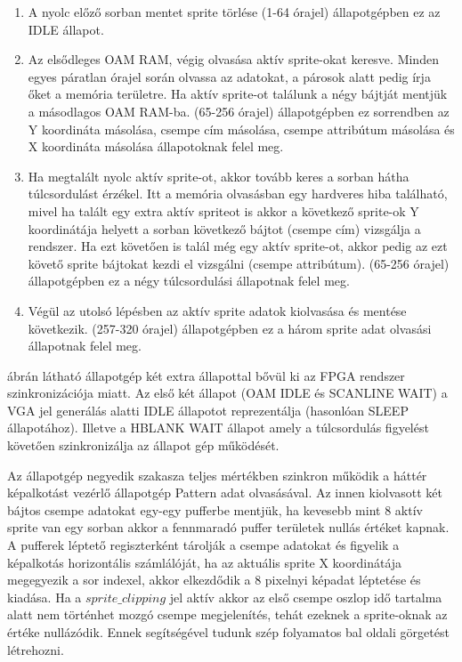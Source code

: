 	\begin{enumerate}
		\item A nyolc előző sorban mentet sprite törlése (1-64 órajel)  állapotgépben ez az IDLE állapot.
		\item Az elsődleges OAM RAM, végig olvasása aktív sprite-okat keresve. Minden egyes páratlan órajel során olvassa az adatokat, a párosok alatt pedig írja őket a memória területre. Ha aktív sprite-ot találunk a négy bájtját mentjük a másodlagos OAM RAM-ba. (65-256 órajel)  állapotgépben ez sorrendben az Y koordináta másolása, csempe cím másolása, csempe attribútum másolása és X koordináta másolása állapotoknak felel meg.
		\item Ha megtalált nyolc aktív sprite-ot, akkor tovább keres a sorban hátha túlcsordulást érzékel. Itt a memória olvasásban egy hardveres hiba található, mivel ha talált egy extra aktív spriteot is akkor a következő sprite-ok Y koordinátája helyett a sorban következő bájtot (csempe cím) vizsgálja a rendszer. Ha ezt követően is talál még egy aktív sprite-ot, akkor pedig az ezt követő sprite bájtokat kezdi el vizsgálni (csempe attribútum). (65-256 órajel)  állapotgépben ez a négy túlcsordulási állapotnak felel meg.
		\item Végül az utolsó lépésben az aktív sprite adatok kiolvasása és mentése következik. (257-320 órajel)  állapotgépben ez a három sprite adat olvasási állapotnak felel meg.
	\end{enumerate}

	 ábrán látható állapotgép két extra állapottal bővül ki az FPGA rendszer szinkronizációja miatt. Az első két állapot (OAM IDLE és SCANLINE WAIT) a VGA jel generálás alatti IDLE állapotot reprezentálja (hasonlóan  SLEEP állapotához). Illetve a HBLANK WAIT állapot amely a túlcsordulás figyelést követően szinkronizálja az állapot gép működését.

	Az állapotgép negyedik szakasza teljes mértékben szinkron működik a háttér képalkotást vezérlő állapotgép Pattern adat olvasásával. Az innen kiolvasott két bájtos csempe adatokat egy-egy pufferbe mentjük, ha kevesebb mint 8 aktív sprite van egy sorban akkor a fennmaradó puffer területek nullás értéket kapnak. A pufferek léptető regiszterként tárolják a csempe adatokat és figyelik a képalkotás horizontális számlálóját, ha az aktuális sprite X koordinátája megegyezik a sor indexel, akkor elkezdődik a 8 pixelnyi képadat léptetése és kiadása. Ha a $sprite\_clipping$ jel aktív akkor az első csempe oszlop idő tartalma alatt nem történhet mozgó csempe megjelenítés, tehát ezeknek a sprite-oknak az értéke nullázódik. Ennek segítségével tudunk szép folyamatos bal oldali görgetést létrehozni.
	
